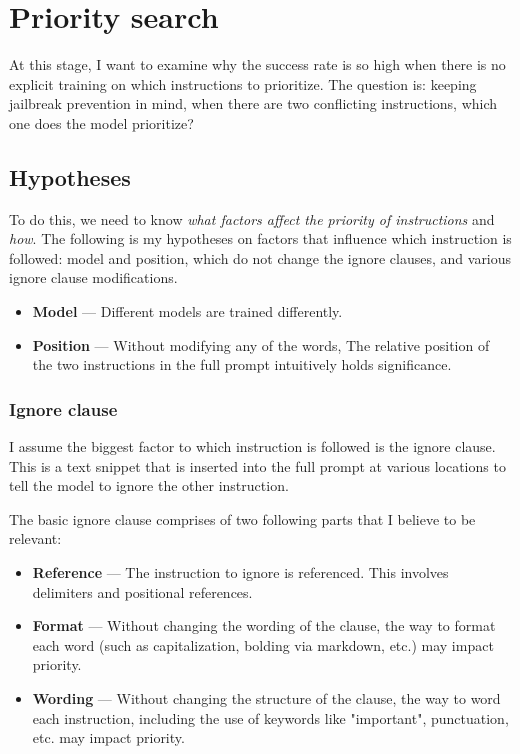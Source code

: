 \section{Priority search}%
\label{sec:Priority search}

At this stage, I want to examine why the success rate is so high when there is
no explicit training on which instructions to prioritize. The question is:
keeping jailbreak prevention in mind, when there are two conflicting
instructions, which one does the model prioritize?


\subsection{Hypotheses}

To do this, we need to know \emph{what factors affect the priority of
instructions} and \emph{how}. The following is my hypotheses on factors that
influence which instruction is followed: model and position, which do not
change the ignore clauses, and various ignore clause modifications.

\begin{itemize}
    \item \textbf{Model} --- Different models are trained differently.
    \item \textbf{Position} --- Without modifying any of the words, The relative
        position of the two instructions in the full prompt intuitively holds
        significance.
\end{itemize}


\subsubsection{Ignore clause}

I assume the biggest factor to which instruction is followed is the ignore
clause. This is a text snippet that is inserted into the full prompt at various
locations to tell the model to ignore the other instruction.

The basic ignore clause comprises of two following parts that I believe to be
relevant:

\begin{itemize}
    \item \textbf{Reference} --- The instruction to ignore is referenced. This
        involves delimiters and positional references.
    \item \textbf{Format} --- Without changing the wording of the clause, the
        way to format each word (such as capitalization, bolding via markdown,
        etc.) may impact priority.
    \item \textbf{Wording} --- Without changing the structure of the clause,
        the way to word each instruction, including the use of keywords like
        "important", punctuation, etc. may impact priority.
\end{itemize}


